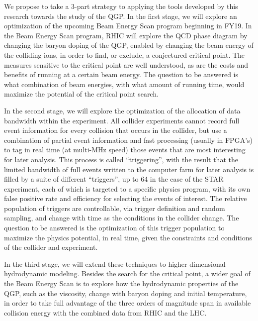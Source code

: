\documentclass[11pt]{article}
\begin{document}
We propose to take a 3-part strategy to applying the tools
developed by this research towards the study of the QGP.
In the first stage, we will explore an optimization of the 
upcoming Beam Energy Scan program beginning in FY19.
In the Beam Energy Scan program, RHIC will 
explore the QCD phase diagram by changing the baryon doping 
of the QGP, enabled by changing the beam energy of
the colliding ions, in order to find, or exclude, a conjectured
critical point.  The measures sensitive to the critical point
are well understood, as are the costs and benefits of running
at a certain beam energy.  The question to be answered is 
what combination of beam energies, with what amount of
running time, would maximize the potential of the critical
point search.

In the second stage, we will explore the optimization
of the allocation of data bandwidth within the experiment.
All collider experiments cannot record full event information
for every collision that occurs in the collider, but use a combination
of partial event information and fast processing (usually in FPGA's)
to tag in real time (at multi-MHz speed) those events
that are most interesting for later analysis.  This process is 
called ``triggering'', with the result that the limited bandwidth
of full events written to the computer farm for later analysis
is filled by a suite of different ``triggers'', up to 64 in the 
case of the STAR experiment, each of which is targeted to
a specific physics program, with its own false positive
rate and efficiency for selecting the events of interest.
 The relative population of triggers are controllable, 
via trigger definition and random
sampling, and change with time as the conditions in the 
collider change.  The question to be answered is the optimization
of this trigger population to maximize the physics potential, in real time,
given the constraints and conditions of the collider and experiment.

In the third stage, we will extend these techniques to 
higher dimensional hydrodynamic modeling.  Besides
the search for the critical point, a wider goal of the Beam Energy
Scan is to explore how the hydrodynamic properties
of the QGP, such as the viscosity, change with baryon 
doping and initial temperature, in order to take 
full advantage of the three orders of magnitude span
in available collision energy with the combined data from RHIC
and the LHC.   
\end{document}
